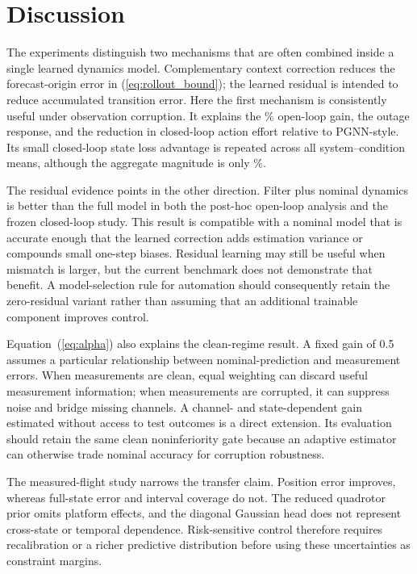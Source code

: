 \section{Discussion}

The experiments distinguish two mechanisms that are often combined inside a
single learned dynamics model. Complementary context correction reduces the
forecast-origin error in (\ref{eq:rollout_bound}); the learned residual is
intended to reduce accumulated transition error. Here the first mechanism is
consistently useful under observation corruption. It explains the
\CorruptImprovement\% open-loop gain, the outage response, and the reduction in
closed-loop action effort relative to PGNN-style. Its small closed-loop state
loss advantage is repeated across all system--condition means, although the
aggregate magnitude is only \ClosedLoopImprovement\%.

The residual evidence points in the other direction. Filter plus nominal
dynamics is better than the full model in both the post-hoc open-loop analysis
and the frozen closed-loop study. This result is compatible with a nominal
model that is accurate enough that the learned correction adds estimation
variance or compounds small one-step biases. Residual learning may still be
useful when mismatch is larger, but the current benchmark does not demonstrate
that benefit. A model-selection rule for automation should consequently retain
the zero-residual variant rather than assuming that an additional trainable
component improves control.

Equation~(\ref{eq:alpha}) also explains the clean-regime result. A fixed gain
of 0.5 assumes a particular relationship between nominal-prediction and
measurement errors. When measurements are clean, equal weighting can discard
useful measurement information; when measurements are corrupted, it can
suppress noise and bridge missing channels. A channel- and state-dependent
gain estimated without access to test outcomes is a direct extension. Its
evaluation should retain the same clean noninferiority gate because an
adaptive estimator can otherwise trade nominal accuracy for corruption
robustness.

The measured-flight study narrows the transfer claim. Position error improves,
whereas full-state error and interval coverage do not. The reduced quadrotor
prior omits platform effects, and the diagonal Gaussian head does not represent
cross-state or temporal dependence. Risk-sensitive control therefore requires
recalibration or a richer predictive distribution before using these
uncertainties as constraint margins.

